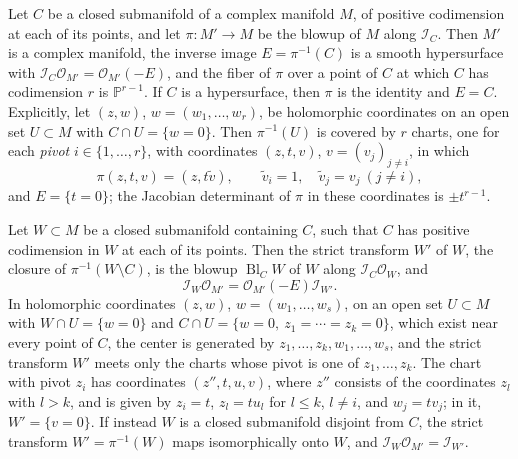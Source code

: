 \begin{proposition}\label{prop:smooth-center-blowup}
Let $C$ be a closed submanifold of a complex manifold $M$, of positive codimension at each of its points, and let $\pi\colon M'\to M$ be the blowup of $M$ along $\mathcal I_C$. Then $M'$ is a complex manifold, the inverse image $E=\pi^{-1}(C)$ is a smooth hypersurface with $\mathcal I_C\mathcal O_{M'}=\mathcal O_{M'}(-E)$, and the fiber of $\pi$ over a point of $C$ at which $C$ has codimension $r$ is $\mathbb P^{r-1}$. If $C$ is a hypersurface, then $\pi$ is the identity and $E=C$. Explicitly, let $(z,w)$, $w=(w_1,\ldots,w_r)$, be holomorphic coordinates on an open set $U\subset M$ with $C\cap U=\{w=0\}$. Then $\pi^{-1}(U)$ is covered by $r$ charts, one for each \emph{pivot} $i\in\{1,\ldots,r\}$, with coordinates $(z,t,v)$, $v=(v_j)_{j\neq i}$, in which
\begin{equation}\label{eq:smooth-center-blowup-chart}
 \pi(z,t,v)=(z,t\tilde v),\qquad\tilde v_i=1,\quad\tilde v_j=v_j\ (j\neq i),
\end{equation}
and $E=\{t=0\}$; the Jacobian determinant of $\pi$ in these coordinates is $\pm t^{r-1}$.

Let $W\subset M$ be a closed submanifold containing $C$, such that $C$ has positive codimension in $W$ at each of its points. Then the strict transform $W'$ of $W$, the closure of $\pi^{-1}(W\setminus C)$, is the blowup $\operatorname{Bl}_CW$ of $W$ along $\mathcal I_C\mathcal O_W$, and
\begin{equation}\label{eq:strict-transform-ideal}
 \mathcal I_W\mathcal O_{M'}=\mathcal O_{M'}(-E)\mathcal I_{W'}.
\end{equation}
In holomorphic coordinates $(z,w)$, $w=(w_1,\ldots,w_s)$, on an open set $U\subset M$ with $W\cap U=\{w=0\}$ and $C\cap U=\{w=0,\ z_1=\cdots=z_k=0\}$, which exist near every point of $C$, the center is generated by $z_1,\ldots,z_k,w_1,\ldots,w_s$, and the strict transform $W'$ meets only the charts whose pivot is one of $z_1,\ldots,z_k$. The chart with pivot $z_i$ has coordinates $(z'',t,u,v)$, where $z''$ consists of the coordinates $z_l$ with $l>k$, and is given by $z_i=t$, $z_l=tu_l$ for $l\leq k$, $l\neq i$, and $w_j=tv_j$; in it, $W'=\{v=0\}$. If instead $W$ is a closed submanifold disjoint from $C$, the strict transform $W'=\pi^{-1}(W)$ maps isomorphically onto $W$, and $\mathcal I_W\mathcal O_{M'}=\mathcal I_{W'}$.
\end{proposition}
